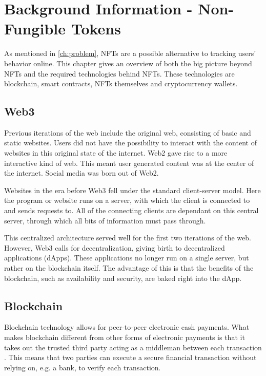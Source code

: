 \chapter{Background Information - Non-Fungible Tokens}
\label{ch:bg_tech}
As mentioned in \ref{ch:problem}, NFTs are a possible alternative to tracking users' behavior online. This chapter gives an overview of both the big picture beyond NFTs and the required technologies behind NFTs. These technologies are blockchain, smart contracts, NFTs themselves and cryptocurrency wallets.

%
%
\section{Web3}
\label{sec:bg_tech:web3}
Previous iterations of the web include the original web, consisting of basic and static websites. Users did not have the possibility to interact with the content of websites in this original state of the internet. Web2 gave rise to a more interactive kind of web. This meant user generated content was at the center of the internet. Social media was born out of Web2. \cite{previousWebIterations}


Websites in the era before Web3 fell under the standard client-server model. Here the program or website runs on a server, with which the client is connected to and sends requests to. All of the connecting clients are dependant on this central server, through which all bits of information must pass through. \cite{dapps}

This centralized architecture served well for the first two iterations of the web. However, Web3 calls for decentralization, giving birth to decentralized applications (dApps). These applications no longer run on a single server, but rather on the blockchain itself. The advantage of this is that the benefits of the blockchain, such as availability and security, are baked right into the dApp. \cite{dapps}


%
%
\section{Blockchain}
\label{sec:bg_tech:blockchain}
Blockchain technology allows for peer-to-peer electronic cash payments. What makes blockchain different from other forms of electronic payments is that it takes out the trusted third party acting as a middleman between each transaction \cite{bitcoin}. This means that two parties can execute a secure financial transaction without relying on, e.g. a bank, to verify each transaction.

